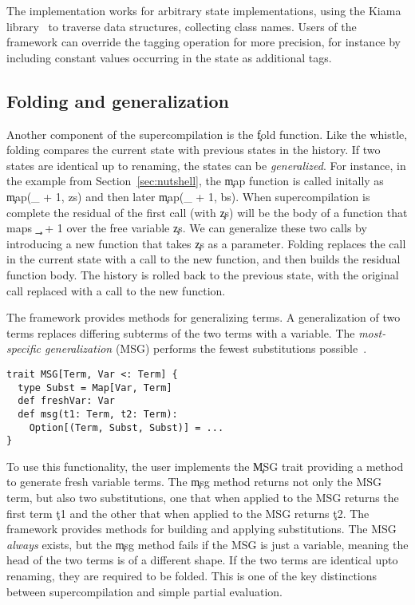The implementation works for arbitrary state implementations, using the Kiama
library~\cite{kiama} to traverse data structures, collecting class names.
Users of the framework can override the tagging operation for more precision,
for instance by including constant values occurring in the state as additional tags.

\subsection{Folding and generalization}

Another component of the supercompilation is the \c{fold} function.
Like the whistle,
folding compares the current state with previous states in the history.
If two states are identical up to renaming, the states can be \emph{generalized}.
For instance, in the example from Section~\ref{sec:nutshell},
the \c{map} function is called initally as
\c{map(\_ + 1, zs)}
and then later
\c{map(\_ + 1, bs)}.
When supercompilation is complete the residual of the first call (with \c{zs})
will be the body of a function that maps \c{\_ + 1} over the free
variable \c{zs}.
We can generalize these two calls by introducing a new function
that takes \c{zs} as a parameter. 
Folding replaces the call in the current state
with a call to the new function, and then builds the residual function body.
The history is rolled back to the previous state, with the original call
replaced with a call to the new function.

The framework provides methods for generalizing terms.
A generalization of two terms
replaces differing subterms of the two terms with a variable.
The \emph{most-specific generalization}
(MSG) 
performs the fewest substitutions possible~\cite{supercompilation-blah}.

\begin{verbatim}
trait MSG[Term, Var <: Term] {
  type Subst = Map[Var, Term]
  def freshVar: Var
  def msg(t1: Term, t2: Term):
    Option[(Term, Subst, Subst)] = ...
}
\end{verbatim}

To use this functionality, the user implements the \c{MSG} trait
providing a method to generate fresh variable terms.
The \c{msg} method returns not only the MSG term, but also two substitutions, one 
that when applied to the MSG returns the first term \c{t1}
and the other that when applied to the MSG returns \c{t2}.
The framework provides methods for building and applying substitutions.
The MSG \emph{always} exists, but the \c{msg} method fails if the MSG
is just a variable, meaning the head of the two terms
is of a different shape.
If the two terms are identical upto renaming, they are
required to be folded. This is one of the key distinctions between supercompilation and simple
partial evaluation.

